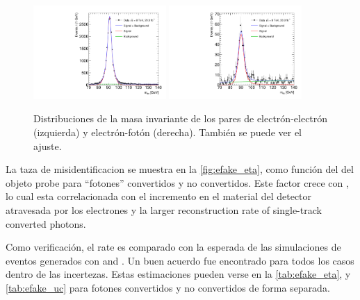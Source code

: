 \begin{figure}[h]
  \begin{center}
    \includegraphics[width=0.45\textwidth]{figures/Fit_mee_efakes_Data_all}  \hfill
    \includegraphics[width=0.45\textwidth]{figures/Fit_meg_efakes_Data_all}
    \caption{Distribuciones de la masa invariante de los pares de electrón-electrón (izquierda) y electrón-fotón (derecha).
    También se puede ver el ajuste.}
    \label{fig:invmass_pairs}
  \end{center}
\end{figure}

La taza de misidentificacion se muestra en la \cref{fig:efake_eta}, como función
del {\abseta} del objeto probe para ``fotones'' convertidos y no convertidos.
Este factor crece con {\abseta}, lo cual esta correlacionada con el incremento en el
material del detector atravesada por los electrones y la larger
reconstruction rate of single-track converted photons.

Como verificación, el rate es comparado con la esperada de las simulaciones de eventos {\Zee}
generados con {\sherpa} and \powheg.
Un buen acuerdo fue encontrado para todos los casos dentro de las incertezas. Estas estimaciones
pueden verse en la \cref{tab:efake_eta}, y \cref{tab:efake_uc} para fotones convertidos
y no convertidos de forma separada.

